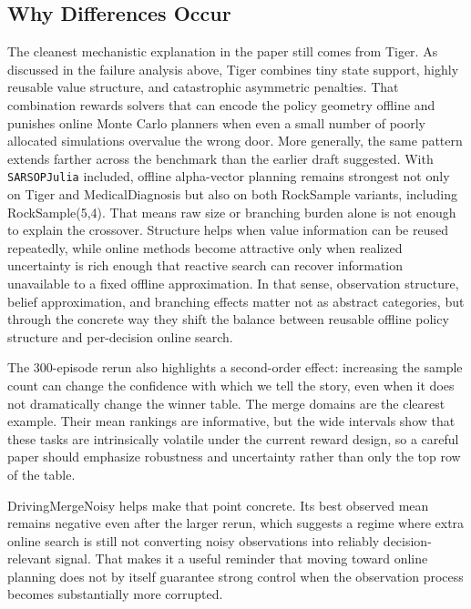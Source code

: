 \documentclass[10pt,twocolumn]{article}
\begin{document}
\subsection{Why Differences Occur}
The cleanest mechanistic explanation in the paper still comes from Tiger. As discussed in the failure analysis above, Tiger combines tiny state support, highly reusable value structure, and catastrophic asymmetric penalties. That combination rewards solvers that can encode the policy geometry offline and punishes online Monte Carlo planners when even a small number of poorly allocated simulations overvalue the wrong door. More generally, the same pattern extends farther across the benchmark than the earlier draft suggested. With \texttt{SARSOPJulia} included, offline alpha-vector planning remains strongest not only on Tiger and MedicalDiagnosis but also on both RockSample variants, including RockSample(5,4). That means raw size or branching burden alone is not enough to explain the crossover. Structure helps when value information can be reused repeatedly, while online methods become attractive only when realized uncertainty is rich enough that reactive search can recover information unavailable to a fixed offline approximation. In that sense, observation structure, belief approximation, and branching effects matter not as abstract categories, but through the concrete way they shift the balance between reusable offline policy structure and per-decision online search.

The 300-episode rerun also highlights a second-order effect: increasing the sample count can change the confidence with which we tell the story, even when it does not dramatically change the winner table. The merge domains are the clearest example. Their mean rankings are informative, but the wide intervals show that these tasks are intrinsically volatile under the current reward design, so a careful paper should emphasize robustness and uncertainty rather than only the top row of the table.

DrivingMergeNoisy helps make that point concrete. Its best observed mean remains negative even after the larger rerun, which suggests a regime where extra online search is still not converting noisy observations into reliably decision-relevant signal. That makes it a useful reminder that moving toward online planning does not by itself guarantee strong control when the observation process becomes substantially more corrupted.
\end{document}
